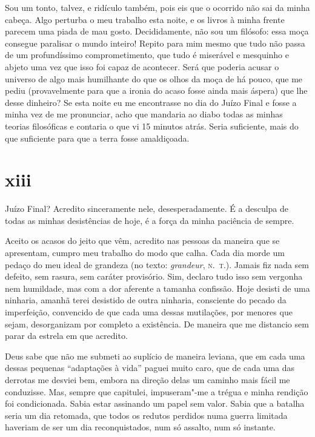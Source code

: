Sou um tonto, talvez, e ridículo também, pois eis que o ocorrido não sai
da minha cabeça. Algo perturba o meu trabalho esta noite, e os livros à
minha frente parecem uma piada de mau gosto. Decididamente, não sou um
filósofo: essa moça consegue paralisar o mundo inteiro! Repito para mim
mesmo que tudo não passa de um profundíssimo comprometimento, que tudo é
miserável e mesquinho e abjeto uma vez que isso foi capaz de acontecer.
Será que poderia acusar o universo de algo mais humilhante do que os
olhos da moça de há pouco, que me pediu (provavelmente para que a ironia
do acaso fosse ainda mais áspera) que lhe desse dinheiro? Se esta
noite eu me encontrasse no dia do Juízo Final e fosse a minha vez de me
pronunciar, acho que mandaria ao diabo todas as minhas teorias
filosóficas e contaria o que vi 15 minutos atrás. Seria suficiente,
mais do que suficiente para que a terra fosse amaldiçoada.

\section{xiii}

Juízo Final? Acredito sinceramente nele, desesperadamente. É a desculpa
de todas as minhas desistências de hoje, é a força da minha paciência de
sempre.

Aceito os acasos do jeito que vêm, acredito nas pessoas da maneira que
se apresentam, cumpro meu trabalho do modo que calha. Cada dia morde um
pedaço do meu ideal de grandeza (no texto: \emph{grandeur}, \textsc{n.~t.}).
Jamais fiz nada sem defeito, sem rasura, sem caráter provisório. Sim,
declaro tudo isso sem vergonha nem humildade, mas com a dor aferente a
tamanha confissão. Hoje desisti de uma ninharia, amanhã terei desistido
de outra ninharia, consciente do pecado da imperfeição, convencido de
que cada uma dessas mutilações, por menores que sejam, desorganizam por
completo a existência. De maneira que me distancio sem parar da estrela
em que acredito.

Deus sabe que não me submeti ao suplício de maneira leviana, que em cada
uma dessas pequenas ``adaptações à vida'' paguei muito caro, que de
cada uma das derrotas me desviei bem, embora na direção delas um
caminho mais fácil me conduzisse. Mas, sempre que capitulei,
impuseram"-me a trégua e minha rendição foi condicionada. Sabia estar
assinando um papel sem valor. Sabia que a batalha seria um dia retomada,
que todos os redutos perdidos numa guerra limitada haveriam de ser um
dia reconquistados, num só assalto, num só instante.

